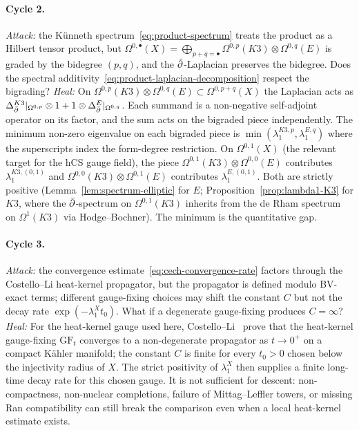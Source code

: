 \paragraph{Cycle 2.} \emph{Attack:} the K\"unneth
spectrum~\eqref{eq:product-spectrum} treats the product as a Hilbert
tensor product, but $\Omega^{0,\bullet}(X) = \bigoplus_{p+q = \bullet}
\Omega^{0,p}(K3) \otimes \Omega^{0,q}(E)$ is graded by the bidegree
$(p,q)$, and the $\bar\partial$-Laplacian preserves the bidegree. Does the
spectral additivity~\eqref{eq:product-laplacian-decomposition} respect
the bigrading?
\emph{Heal:} On $\Omega^{0,p}(K3) \otimes \Omega^{0,q}(E) \subset
\Omega^{0,p+q}(X)$ the Laplacian acts as
$\Delta_{\bar\partial}^{K3}|_{\Omega^{0,p}} \otimes 1 + 1 \otimes
\Delta_{\bar\partial}^E|_{\Omega^{0,q}}$. Each summand is a non-negative
self-adjoint operator on its factor, and the sum acts on the bigraded
piece independently. The minimum non-zero eigenvalue on each bigraded
piece is $\min(\lambda_1^{K3, p}, \lambda_1^{E, q})$ where the
superscripts index the form-degree restriction. On
$\Omega^{0,1}(X)$ (the relevant target for the hCS gauge field), the
piece $\Omega^{0,1}(K3) \otimes \Omega^{0,0}(E)$ contributes
$\lambda_1^{K3, (0,1)}$ and $\Omega^{0,0}(K3) \otimes \Omega^{0,1}(E)$
contributes $\lambda_1^{E, (0,1)}$. Both are strictly positive
\textup{(}Lemma~\ref{lem:spectrum-elliptic} for $E$;
Proposition~\ref{prop:lambda1-K3} for $K3$, where the $\bar\partial$-spectrum
on $\Omega^{0,1}(K3)$ inherits from the de Rham spectrum on
$\Omega^1(K3)$ via Hodge--Bochner\textup{).} The minimum is the
quantitative gap.

\paragraph{Cycle 3.} \emph{Attack:} the convergence
estimate~\eqref{eq:cech-convergence-rate} factors through the
Costello--Li heat-kernel propagator, but the propagator is
defined modulo BV-exact terms; different gauge-fixing choices may
shift the constant $C$ but not the decay rate $\exp(-\lambda_1^X t_0)$.
What if a degenerate gauge-fixing produces $C = \infty$?
\emph{Heal:} For the heat-kernel gauge used here, Costello--Li~\cite{CostelloLi2012} prove that the
heat-kernel gauge-fixing $\mathrm{GF}_t$ converges to a non-degenerate
propagator as $t \to 0^+$ on a compact K\"ahler manifold; the constant
$C$ is finite for every $t_0 > 0$ chosen below the injectivity radius
of $X$. The strict positivity of $\lambda_1^X$ then supplies a finite
long-time decay rate for this chosen gauge. It is not sufficient for
descent: non-compactness, non-nuclear completions, failure of
Mittag--Leffler towers, or missing Ran compatibility can still break
the comparison even when a local heat-kernel estimate exists.

